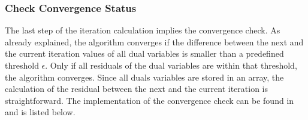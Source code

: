 \subsubsection*{Check Convergence Status}

The last step of the iteration calculation implies the convergence check. As already explained, the algorithm converges if the difference between the next and the current iteration values of all dual variables is smaller than a predefined threshold $\epsilon$. Only if all residuals of the dual variables are within that threshold, the algorithm converges. Since all duals variables are stored in an array, the calculation of the residual between the next and the current iteration is straightforward. The implementation of the convergence check can be found in  and is listed below.



